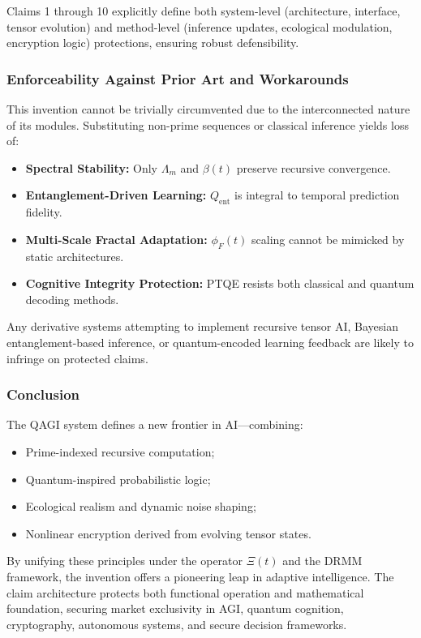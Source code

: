 \documentclass{article}
\theoremstyle{plain}
\theoremstyle{claimstyle}
\begin{document}
Claims 1 through 10 explicitly define both system-level (architecture, interface, tensor evolution) and method-level (inference updates, ecological modulation, encryption logic) protections, ensuring robust defensibility.

\subsubsection{Enforceability Against Prior Art and Workarounds}

This invention cannot be trivially circumvented due to the interconnected nature of its modules. Substituting non-prime sequences or classical inference yields loss of:
\begin{itemize}
    \item \textbf{Spectral Stability:} Only $\Lambda_m$ and $\beta(t)$ preserve recursive convergence.
    \item \textbf{Entanglement-Driven Learning:} $Q_{\text{ent}}$ is integral to temporal prediction fidelity.
    \item \textbf{Multi-Scale Fractal Adaptation:} $\phi_F(t)$ scaling cannot be mimicked by static architectures.
    \item \textbf{Cognitive Integrity Protection:} PTQE resists both classical and quantum decoding methods.
\end{itemize}

Any derivative systems attempting to implement recursive tensor AI, Bayesian entanglement-based inference, or quantum-encoded learning feedback are likely to infringe on protected claims.

\subsubsection{Conclusion}

The QAGI system defines a new frontier in AI—combining:
\begin{itemize}
    \item Prime-indexed recursive computation;
    \item Quantum-inspired probabilistic logic;
    \item Ecological realism and dynamic noise shaping;
    \item Nonlinear encryption derived from evolving tensor states.
\end{itemize}

By unifying these principles under the operator $\Xi(t)$ and the DRMM framework, the invention offers a pioneering leap in adaptive intelligence. The claim architecture protects both functional operation and mathematical foundation, securing market exclusivity in AGI, quantum cognition, cryptography, autonomous systems, and secure decision frameworks.
\end{document}
